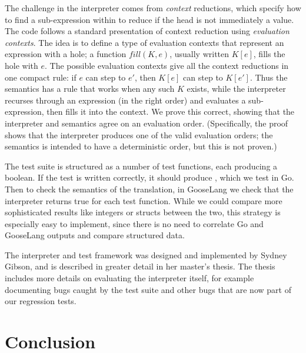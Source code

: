 The challenge in the interpreter comes from \emph{context} reductions,
which specify how to find a sub-expression within  to reduce
if the head is not immediately a value. The code follows a standard
presentation of context reduction using \emph{evaluation contexts}. The
idea is to define a type of evaluation contexts  that
represent an expression with a hole; a function $fill(K, e)$, usually
written $K[e]$, fills the hole with $e$. The possible evaluation
contexts give all the context reductions in one compact rule: if $e$
can step to $e'$, then $K[e]$ can step to $K[e']$. Thus the
semantics has a rule that works when any such $K$ exists, while the
interpreter recurses through an expression (in the right order) and
evaluates a sub-expression, then fills it into the context. We prove
this correct, showing that the interpreter and semantics agree on an
evaluation order. (Specifically, the proof shows that the interpreter
produces one of the valid evaluation orders; the semantics is intended
to have a deterministic order, but this is not proven.)

The test suite is structured as a number of test functions, each
producing a boolean. If the test is written correctly, it should produce
, which we test in Go. Then to check the semantics of the
translation, in GooseLang we check that the interpreter returns true for
each test function. While we could compare more sophisticated results
like integers or structs between the two, this strategy is especially
easy to implement, since there is no need to correlate Go and GooseLang
outputs and compare structured data.

The interpreter and test framework was designed and implemented by
Sydney Gibson, and is described in greater detail in her master's
thesis. The thesis includes more details on evaluating the interpreter
itself, for example documenting bugs caught by the test suite and other
bugs that are now part of our regression tests.

\section{Conclusion}


\resume
